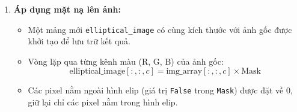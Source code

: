 \begin{enumerate}
	\item \textbf{Áp dụng mặt nạ lên ảnh:}
	      \begin{itemize}
		      \item Một mảng mới \texttt{elliptical\_image} có cùng kích thước với ảnh gốc được khởi tạo để lưu trữ kết quả.
		      \item Vòng lặp qua từng kênh màu (R, G, B) của ảnh gốc:
		            \[
			            \text{elliptical\_image}[:, :, c] = \text{img\_array}[:, :, c] \times \text{Mask}
		            \]
		      \item Các pixel nằm ngoài hình elip (giá trị \texttt{False} trong \texttt{Mask}) được đặt về 0, giữ lại chỉ các pixel nằm trong hình elip.
	      \end{itemize}

\end{enumerate}
